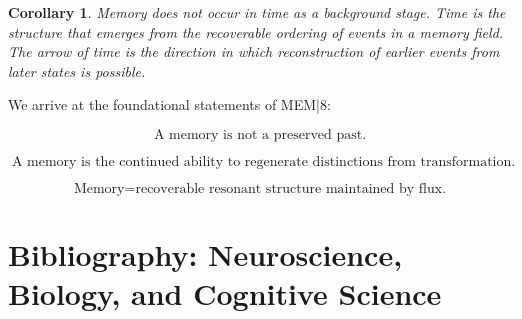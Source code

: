 \documentclass[12pt, oneside]{book}
\theoremstyle{plain}
\newtheorem{corollary}[theorem]{Corollary}
\theoremstyle{definition}
\theoremstyle{remark}
\begin{document}
\begin{corollary}
Memory does not occur \emph{in} time as a background stage.
Time is the structure that emerges from the recoverable
ordering of events in a memory field.
The arrow of time is the direction in which reconstruction
of earlier events from later states is possible.
\end{corollary}

\bigskip

\noindent We arrive at the foundational statements of MEM|8:

\[
  \boxed{\;
    \text{A memory is not a preserved past.}
  \;}
\]

\[
  \boxed{\;
    \text{A memory is the continued ability to regenerate distinctions
    from transformation.}
  \;}
\]

\[
  \boxed{\;
    \text{Memory} = \text{recoverable resonant structure maintained by flux.}
  \;}
\]


\backmatter

\chapter*{Bibliography: Neuroscience, Biology, and Cognitive Science}
\end{document}
